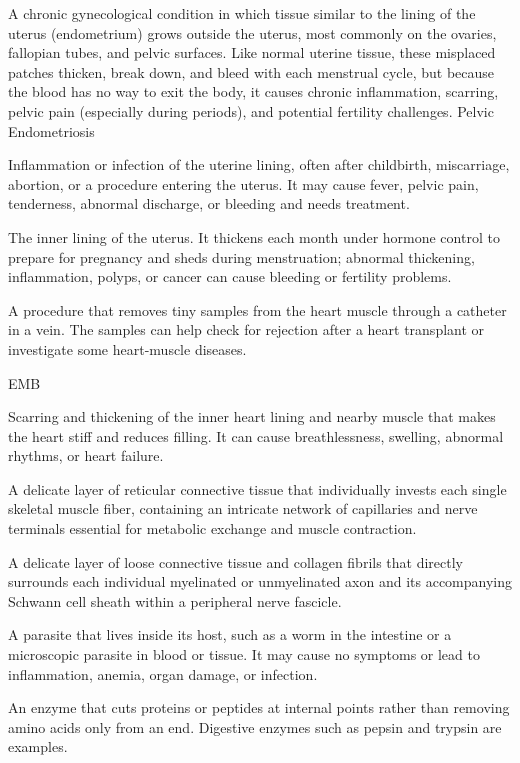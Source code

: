  A chronic gynecological condition in which tissue similar to the lining of the uterus (endometrium) grows outside the uterus, most commonly on the ovaries, fallopian tubes, and pelvic surfaces. Like normal uterine tissue, these misplaced patches thicken, break down, and bleed with each menstrual cycle, but because the blood has no way to exit the body, it causes chronic inflammation, scarring, pelvic pain (especially during periods), and potential fertility challenges.
\synonyms
Pelvic Endometriosis

 Inflammation or infection of the uterine lining, often after childbirth, miscarriage, abortion, or a procedure entering the uterus. It may cause fever, pelvic pain, tenderness, abnormal discharge, or bleeding and needs treatment.

 The inner lining of the uterus. It thickens each month under hormone control to prepare for pregnancy and sheds during menstruation; abnormal thickening, inflammation, polyps, or cancer can cause bleeding or fertility problems.

 A procedure that removes tiny samples from the heart muscle through a catheter in a vein. The samples can help check for rejection after a heart transplant or investigate some heart-muscle diseases.

\synonyms
EMB

 Scarring and thickening of the inner heart lining and nearby muscle that makes the heart stiff and reduces filling. It can cause breathlessness, swelling, abnormal rhythms, or heart failure.

 A delicate layer of reticular connective tissue that individually invests each single skeletal muscle fiber, containing an intricate network of capillaries and nerve terminals essential for metabolic exchange and muscle contraction.

 A delicate layer of loose connective tissue and collagen fibrils that directly surrounds each individual myelinated or unmyelinated axon and its accompanying Schwann cell sheath within a peripheral nerve fascicle.

 A parasite that lives inside its host, such as a worm in the intestine or a microscopic parasite in blood or tissue. It may cause no symptoms or lead to inflammation, anemia, organ damage, or infection.

 An enzyme that cuts proteins or peptides at internal points rather than removing amino acids only from an end. Digestive enzymes such as pepsin and trypsin are examples.


